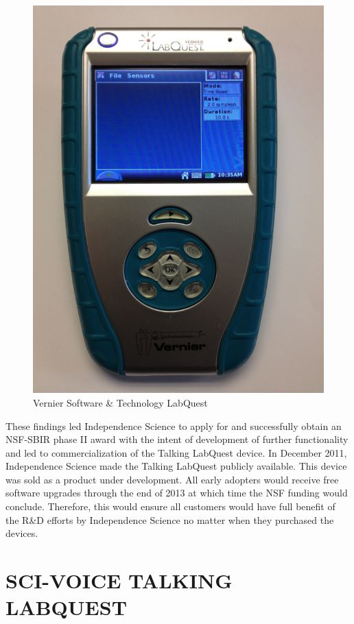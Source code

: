 \documentclass[11.5pt]{sig-alternate} %
\begin{document}
\begin{large}
\begin{figure}[h]
    \centering
    \includegraphics[width=1\linewidth]{images/fig1.png}
    \caption{Vernier Software \& Technology LabQuest}
\end{figure}
 
These findings led Independence Science to apply for and successfully obtain an NSF-SBIR phase II award with the intent of development of further functionality and led to commercialization of the Talking LabQuest device. In December 2011, Independence Science made the Talking LabQuest publicly available. This device was sold as a product under development. All early adopters would receive free software upgrades through the end of 2013 at which time the NSF funding would conclude. Therefore, this would ensure all customers would have full benefit of the R\&D efforts by Independence Science no matter when they purchased the devices.

\section*{SCI-VOICE TALKING LABQUEST}


\end{large}
\end{document}
